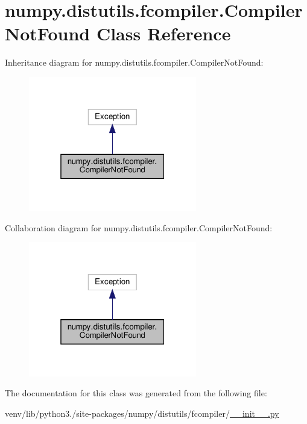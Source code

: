\hypertarget{classnumpy_1_1distutils_1_1fcompiler_1_1CompilerNotFound}{}\section{numpy.\+distutils.\+fcompiler.\+Compiler\+Not\+Found Class Reference}
\label{classnumpy_1_1distutils_1_1fcompiler_1_1CompilerNotFound}


Inheritance diagram for numpy.\+distutils.\+fcompiler.\+Compiler\+Not\+Found\+:
\nopagebreak
\begin{figure}[H]
\begin{center}
\leavevmode
\includegraphics[width=208pt]{classnumpy_1_1distutils_1_1fcompiler_1_1CompilerNotFound__inherit__graph}
\end{center}
\end{figure}


Collaboration diagram for numpy.\+distutils.\+fcompiler.\+Compiler\+Not\+Found\+:
\nopagebreak
\begin{figure}[H]
\begin{center}
\leavevmode
\includegraphics[width=208pt]{classnumpy_1_1distutils_1_1fcompiler_1_1CompilerNotFound__coll__graph}
\end{center}
\end{figure}


The documentation for this class was generated from the following file\+:\begin{DoxyCompactItemize}
\item 
venv/lib/python3./site-\/packages/numpy/distutils/fcompiler/\hyperlink{venv_2lib_2python3_89_2site-packages_2numpy_2distutils_2fcompiler_2____init_____8py}{\+\_\+\+\_\+init\+\_\+\+\_\+.\+py}\end{DoxyCompactItemize}
